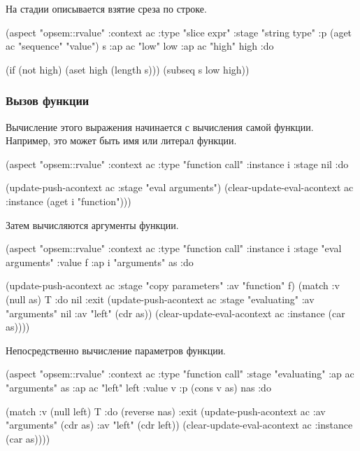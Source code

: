 \documentclass[12pt,twoside,russian]{article}
\newcommand{\textABMLString}[1]{{\color{abmlString}#1}}
\newcommand{\ABMLString}[1]{\abmlinline{\textABMLString{#1}}}
\begin{document}
На стадии \ABMLString{array type} описывается взятие среза по строке.

\begin{ABMLCode}
(aspect "opsem::rvalue" :context ac :type "slice expr" 
  :stage "string type" :p (aget ac "sequence" "value") s 
  :ap ac "low" low :ap ac "high" high :do 
  
  (if (not high) (aset high (length s)))
  (subseq s low high))
\end{ABMLCode}

\subsubsection{Вызов функции}
Вычисление этого выражения начинается с вычисления самой функции. Например, это может быть имя или литерал функции.

\begin{ABMLCode}
(aspect "opsem::rvalue" :context ac :type "function call" :instance i 
  :stage nil :do 
  
  (update-push-acontext ac :stage "eval arguments")
  (clear-update-eval-acontext ac :instance (aget i "function")))
\end{ABMLCode}

Затем вычисляются аргументы функции.

\begin{ABMLCode}
(aspect "opsem::rvalue" :context ac :type "function call" :instance i 
  :stage "eval arguments" :value f :ap i "arguments" as :do 
  
  (update-push-acontext ac :stage "copy parameters" :av "function" f)
  (match :v (null as) T :do nil 
  :exit (update-push-acontext ac :stage "evaluating" :av "arguments" nil 
                                 :av "left" (cdr as))
        (clear-update-eval-acontext ac :instance (car as))))
\end{ABMLCode}

Непосредственно вычисление параметров функции.

\begin{ABMLCode}
(aspect "opsem::rvalue" :context ac :type "function call" 
  :stage "evaluating" :ap ac "arguments" as :ap ac "left" left 
  :value v :p (cons v as) nas :do 
  
  (match :v (null left) T :do (reverse nas) 
  :exit (update-push-acontext ac :av "arguments" (cdr as) 
                                 :av "left" (cdr left))
        (clear-update-eval-acontext ac :instance (car as))))
\end{ABMLCode}
\end{document}
